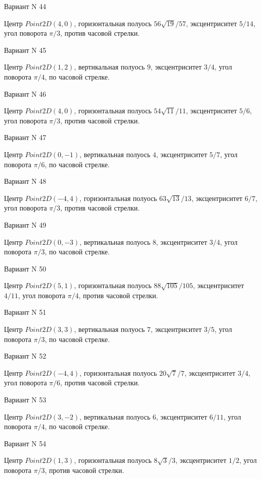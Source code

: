 \documentclass[11pt]{report}
\begin{document}
Вариант N 44

Центр $Point2D\left(4, 0\right)$, горизонтальная полуось $56 \sqrt{19} / 57$, эксцентриситет $5 / 14$, угол поворота $\pi / 3$, против часовой стрелки.

Вариант N 45

Центр $Point2D\left(1, 2\right)$, вертикальная полуось $9$, эксцентриситет $3 / 4$, угол поворота $\pi / 4$, по часовой стрелке.

Вариант N 46

Центр $Point2D\left(4, 0\right)$, горизонтальная полуось $54 \sqrt{11} / 11$, эксцентриситет $5 / 6$, угол поворота $\pi / 3$, против часовой стрелки.

Вариант N 47

Центр $Point2D\left(0, -1\right)$, вертикальная полуось $4$, эксцентриситет $5 / 7$, угол поворота $\pi / 6$, по часовой стрелке.

Вариант N 48

Центр $Point2D\left(-4, 4\right)$, горизонтальная полуось $63 \sqrt{13} / 13$, эксцентриситет $6 / 7$, угол поворота $\pi / 3$, против часовой стрелки.

Вариант N 49

Центр $Point2D\left(0, -3\right)$, вертикальная полуось $8$, эксцентриситет $3 / 4$, угол поворота $\pi / 3$, по часовой стрелке.

Вариант N 50

Центр $Point2D\left(5, 1\right)$, горизонтальная полуось $88 \sqrt{105} / 105$, эксцентриситет $4 / 11$, угол поворота $\pi / 4$, против часовой стрелки.

Вариант N 51

Центр $Point2D\left(3, 3\right)$, вертикальная полуось $7$, эксцентриситет $3 / 5$, угол поворота $\pi / 3$, по часовой стрелке.

Вариант N 52

Центр $Point2D\left(-4, 4\right)$, горизонтальная полуось $20 \sqrt{7} / 7$, эксцентриситет $3 / 4$, угол поворота $\pi / 6$, против часовой стрелки.

Вариант N 53

Центр $Point2D\left(3, -2\right)$, вертикальная полуось $6$, эксцентриситет $6 / 11$, угол поворота $\pi / 4$, по часовой стрелке.

Вариант N 54

Центр $Point2D\left(1, 3\right)$, горизонтальная полуось $8 \sqrt{3} / 3$, эксцентриситет $1 / 2$, угол поворота $\pi / 3$, против часовой стрелки.
\end{document}
